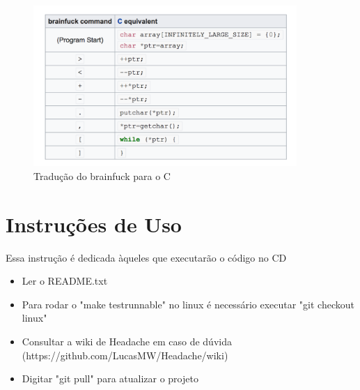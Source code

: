 \begin{figure}[h]
    \centering
	\includegraphics[width = 10cm]{TD/img/C.png}
	\caption{Tradução do brainfuck para o C}
	\label{traducao}
\end{figure}

\chapter{Instruções de Uso}

Essa instrução é dedicada àqueles que executarão o código no CD

\begin{itemize}
    \item Ler o README.txt
    \item Para rodar o "make testrunnable" no linux é necessário executar "git checkout linux" 
    \item Consultar a wiki de Headache em caso de dúvida (https://github.com/LucasMW/Headache/wiki)
    \item Digitar "git pull" para atualizar o projeto
\end{itemize}